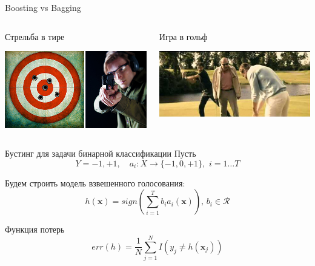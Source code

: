 \documentclass[10pt]{beamer}
\begin{document}
\begin{frame}{Boosting vs Bagging}
\begin{columns}[C]
    \begin{column}{.5\textwidth}
        \begin{block}{Стрельба в тире}
        \end{block}
        \begin{center}
            \includegraphics[scale=0.33]{images/tir.jpg}
        \end{center}
    \end{column}
    \begin{column}{.5\textwidth}
        \begin{block}{Игра в гольф}
        \end{block}
        \begin{center}
            \includegraphics[scale=0.35]{images/golf.jpg}
        \end{center}
    \end{column}
\end{columns}
\end{frame}

\begin{frame}{Бустинг для задачи бинарной классификации}
Пусть
\[
    Y={-1, +1}, \quad a_i : X \rightarrow \{ -1, 0, +1 \}, \,\, i=1 \ldots T
\]

\vspace{1em}
Будем строить модель взвешенного голосования:
\[
    h(\mathbf{x}) = sign \left( \sum \limits_{i=1}^{T} b_i a_i(\mathbf{x})
    \right), \, b_i \in \mathcal{R}
\]

\vspace{1em}
Функция потерь
\[
    err(h) = \frac{1}{N} \sum \limits _{j=1}^N I(y_j \neq h(\mathbf{x}_j))
\]
\end{frame}
\end{document}
